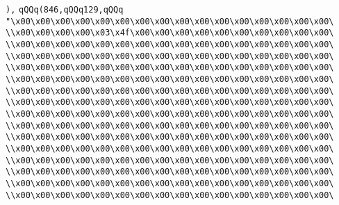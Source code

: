\verb|),|\newline
\verb|qQQq(846,qQQq129,qQQq|\newline
\verb|"\x00\x00\x00\x00\x00\x00\x00\x00\x00\x00\x00\x00\x00\x00\x00\x00\|\newline
\verb|\\x00\x00\x00\x00\x03\x4f\x00\x00\x00\x00\x00\x00\x00\x00\x00\x00\|\newline
\verb|\\x00\x00\x00\x00\x00\x00\x00\x00\x00\x00\x00\x00\x00\x00\x00\x00\|\newline
\verb|\\x00\x00\x00\x00\x00\x00\x00\x00\x00\x00\x00\x00\x00\x00\x00\x00\|\newline
\verb|\\x00\x00\x00\x00\x00\x00\x00\x00\x00\x00\x00\x00\x00\x00\x00\x00\|\newline
\verb|\\x00\x00\x00\x00\x00\x00\x00\x00\x00\x00\x00\x00\x00\x00\x00\x00\|\newline
\verb|\\x00\x00\x00\x00\x00\x00\x00\x00\x00\x00\x00\x00\x00\x00\x00\x00\|\newline
\verb|\\x00\x00\x00\x00\x00\x00\x00\x00\x00\x00\x00\x00\x00\x00\x00\x00\|\newline
\verb|\\x00\x00\x00\x00\x00\x00\x00\x00\x00\x00\x00\x00\x00\x00\x00\x00\|\newline
\verb|\\x00\x00\x00\x00\x00\x00\x00\x00\x00\x00\x00\x00\x00\x00\x00\x00\|\newline
\verb|\\x00\x00\x00\x00\x00\x00\x00\x00\x00\x00\x00\x00\x00\x00\x00\x00\|\newline
\verb|\\x00\x00\x00\x00\x00\x00\x00\x00\x00\x00\x00\x00\x00\x00\x00\x00\|\newline
\verb|\\x00\x00\x00\x00\x00\x00\x00\x00\x00\x00\x00\x00\x00\x00\x00\x00\|\newline
\verb|\\x00\x00\x00\x00\x00\x00\x00\x00\x00\x00\x00\x00\x00\x00\x00\x00\|\newline
\verb|\\x00\x00\x00\x00\x00\x00\x00\x00\x00\x00\x00\x00\x00\x00\x00\x00\|\newline
\verb|\\x00\x00\x00\x00\x00\x00\x00\x00\x00\x00\x00\x00\x00\x00\x00\x00\|\newline
